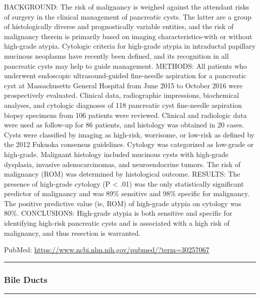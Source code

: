 \documentclass[]{article}
\begin{document}
BACKGROUND: The risk of malignancy is weighed against the attendant
risks of surgery in the clinical management of pancreatic cysts. The
latter are a group of histologically diverse and prognostically variable
entities, and the risk of malignancy therein is primarily based on
imaging characteristics-with or without high-grade atypia. Cytologic
criteria for high-grade atypia in intraductal papillary mucinous
neoplasms have recently been defined, and its recognition in all
pancreatic cysts may help to guide management. METHODS: All patients who
underwent endoscopic ultrasound-guided fine-needle aspiration for a
pancreatic cyst at Massachusetts General Hospital from June 2015 to
October 2016 were prospectively evaluated. Clinical data, radiographic
impressions, biochemical analyses, and cytologic diagnoses of 118
pancreatic cyst fine-needle aspiration biopsy specimens from 106
patients were reviewed. Clinical and radiologic data were used as
follow-up for 86 patients, and histology was obtained in 20 cases. Cysts
were classified by imaging as high-risk, worrisome, or low-risk as
defined by the 2012 Fukuoka consensus guidelines. Cytology was
categorized as low-grade or high-grade. Malignant histology included
mucinous cysts with high-grade dysplasia, invasive adenocarcinomas, and
neuroendocrine tumors. The risk of malignancy (ROM) was determined by
histological outcome. RESULTS: The presence of high-grade cytology (P
\textless{} .01) was the only statistically significant predictor of
malignancy and was 89\% sensitive and 98\% specific for malignancy. The
positive predictive value (ie, ROM) of high-grade atypia on cytology was
80\%. CONCLUSIONS: High-grade atypia is both sensitive and specific for
identifying high-risk pancreatic cysts and is associated with a high
risk of malignancy, and thus resection is warranted.

PubMed: \url{https://www.ncbi.nlm.nih.gov/pubmed/?term=30257067}

{}

{}

\begin{center}\rule{0.5\linewidth}{\linethickness}\end{center}

\hypertarget{bile-ducts-1}{%
\subsubsection{Bile Ducts}\label{bile-ducts-1}}

\begin{center}\rule{0.5\linewidth}{\linethickness}\end{center}
\end{document}
